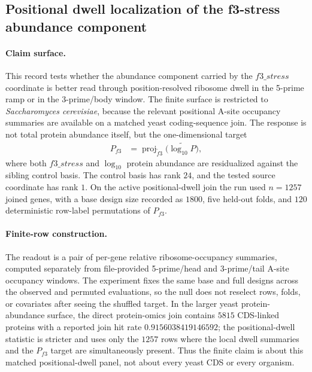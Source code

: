 
\subsection{Positional dwell localization of the f3-stress abundance component}
\label{sec:bioreality-f3-stress-dwell-positional-ramp-body}

\paragraph{Claim surface.}
This record tests whether the abundance component carried by the $f3\_stress$ coordinate is better read through position-resolved ribosome dwell in the 5-prime ramp or in the 3-prime/body window.  The finite surface is restricted to \textit{Saccharomyces cerevisiae}, because the relevant positional A-site occupancy summaries are available on a matched yeast coding-sequence join.  The response is not total protein abundance itself, but the one-dimensional target
$$
\begin{aligned}
P_{f3} &= \operatorname{proj}_{\widetilde f3}\bigl(\widetilde{\log_{10} P}\bigr),
\end{aligned}
$$
where both $f3\_stress$ and $\log_{10}$ protein abundance are residualized against the sibling control basis.  The control basis has rank $24$, and the tested source coordinate has rank $1$.  On the active positional-dwell join the run used $n=1257$ joined genes, with a base design size recorded as $1800$, five held-out folds, and $120$ deterministic row-label permutations of $P_{f3}$.

\paragraph{Finite-row construction.}
The readout is a pair of per-gene relative ribosome-occupancy summaries, computed separately from file-provided 5-prime/head and 3-prime/tail A-site occupancy windows.  The experiment fixes the same base and full designs across the observed and permuted evaluations, so the null does not reselect rows, folds, or covariates after seeing the shuffled target.  In the larger yeast protein-abundance surface, the direct protein-omics join contains $5815$ CDS-linked proteins with a reported join hit rate $0.9156038419146592$; the positional-dwell statistic is stricter and uses only the $1257$ rows where the local dwell summaries and the $P_{f3}$ target are simultaneously present.  Thus the finite claim is about this matched positional-dwell panel, not about every yeast CDS or every organism.

